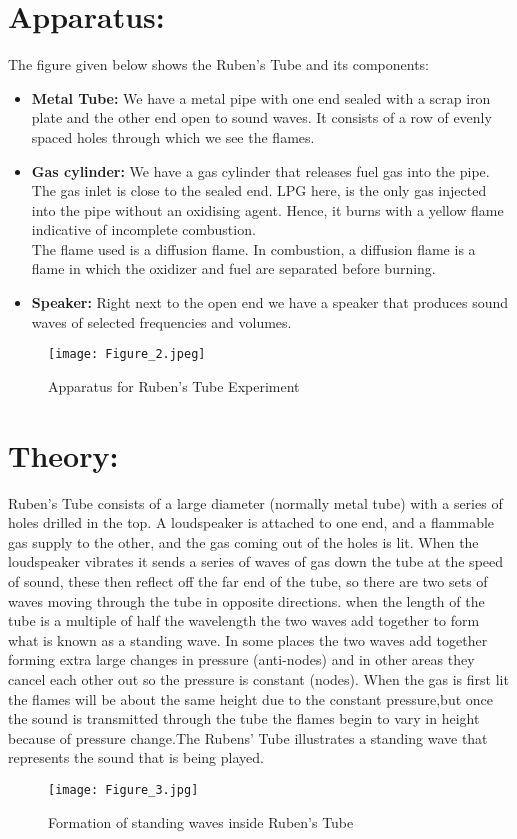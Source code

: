\documentclass[12pt,a4paper]{article}
\begin{document}
\section{Apparatus:}
The figure given below shows the Ruben's Tube and its components:
\begin{itemize}
\item \textbf{Metal Tube:} We have a metal pipe with one end sealed with a scrap iron plate and the other end open to sound waves. It consists of a row of evenly spaced holes through which we see the flames.
\item \textbf{Gas cylinder:} We have a gas cylinder that releases fuel gas into the pipe. The gas inlet is close to the sealed end. LPG here, is the only gas injected into the pipe without an oxidising agent. Hence, it burns with a yellow flame indicative of incomplete combustion.
\\The flame used is a diffusion flame. In combustion, a diffusion flame is a flame in which the oxidizer and fuel are separated before burning.
\item \textbf{Speaker:} Right next to the open end we have a speaker that produces sound waves of selected frequencies and volumes.
\end{itemize}
\begin{figure}[!ht]
	\begin{center}
		\texttt{[image: Figure\_2.jpeg]}
	\end{center}
	\caption{Apparatus for Ruben's Tube Experiment}
\end{figure}
\clearpage
\section{Theory:}
Ruben’s Tube consists of a large diameter (normally metal tube) with a series of holes drilled in the top. A loudspeaker is attached to one end, and a flammable gas supply to the other, and the gas coming out of the holes is lit. When the loudspeaker vibrates it sends a series of waves of gas down the tube at the
speed of sound, these then reflect off the far end of the tube, so there are two sets of waves moving through the tube in opposite directions. when the length of the tube is a multiple of half the wavelength the two waves add together to form what is known as a standing wave. In some places the two waves add together forming extra large changes in pressure (anti-nodes) and in other areas they cancel each other out so the pressure is constant (nodes). When the gas is first lit the flames will be about the same height due to the constant pressure,but once the sound is transmitted through the tube the flames begin to vary in height because of pressure change.The Rubens’ Tube illustrates a standing wave that represents the sound that is being played.\\
\begin{figure}[!ht]
	\begin{center}
		\texttt{[image: Figure\_3.jpg]}
	\end{center}
	\caption{Formation of standing waves inside Ruben’s Tube}
\end{figure}
\end{document}
